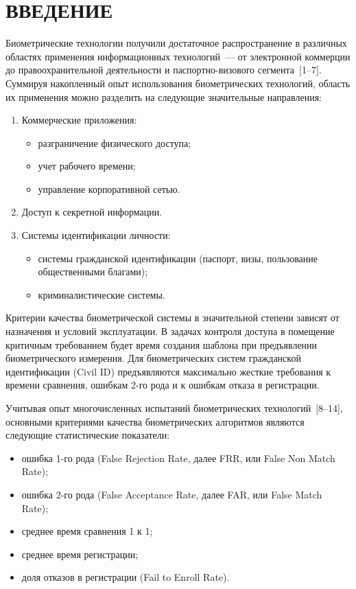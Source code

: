       \begin{multicols}{2}

      \label{st\stat}


  \section{ВВЕДЕНИЕ}
  
  Биометрические технологии получили достаточное распространение в 
различных областях применения информационных технологий~--- от электронной 
коммерции до правоохранительной %
деятель\-ности и 
  пас\-порт\-но-ви\-зо\-во\-го сегмента~[1--7]. Суммируя накопленный опыт 
использования биометрических технологий, область их применения можно 
разделить на следующие значительные направления:
  \begin{enumerate}[1.]
  \item Коммерческие приложения:
  \begin{itemize}
\item разграничение физического доступа;
\item учет рабочего времени;
\item управление корпоративной сетью.
\end{itemize}
  \item  Доступ к секретной информации.
  \item Системы идентификации личности:
  \begin{itemize}
\item системы гражданской идентификации (паспорт, визы, 
пользование общественными благами);
\item криминалистические системы.
  \end{itemize}
  \end{enumerate}
  
  Критерии качества биометрической системы в значительной степени зависят 
от назначения и условий эксплуатации. В задачах контроля доступа в 
помещение критичным требованием будет время создания шаблона при 
предъявлении биометрического измерения. Для биометрических систем 
гражданской идентификации (Civil ID) предъявляются максимально жесткие 
требования к времени сравнения, ошибкам 2-го рода и к ошибкам отказа в 
регистрации.
  
  Учитывая опыт многочисленных испытаний биометрических 
  технологий~[8--14], основными критериями качества биометрических 
алгоритмов являются следующие статистические показатели:
  \begin{itemize}
\item ошибка 1-го рода (False Rejection Rate, далее FRR, или False Non 
Match Rate);
\item ошибка 2-го рода (False Acceptance Rate, далее FAR, или False 
Match Rate);
\item среднее время сравнения 1 к 1;
\item среднее время регистрации;
\item доля отказов в регистрации (Fail to Enroll Rate).
\end{itemize}
  

\end{multicols}
